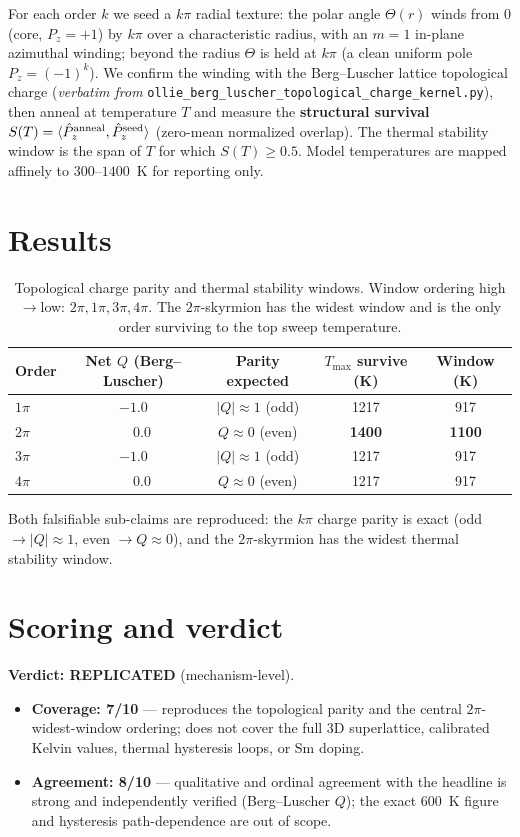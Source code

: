 \documentclass[11pt]{article}
\begin{document}
For each order $k$ we seed a $k\pi$ radial texture: the polar angle
$\Theta(r)$ winds from $0$ (core, $P_z=+1$) by $k\pi$ over a characteristic
radius, with an $m=1$ in-plane azimuthal winding; beyond the radius $\Theta$ is
held at $k\pi$ (a clean uniform pole $P_z=(-1)^k$). We confirm the winding with
the Berg--Luscher lattice topological charge (\emph{verbatim from}
\texttt{ollie\_berg\_luscher\_topological\_charge\_kernel.py}), then anneal at
temperature $T$ and measure the \textbf{structural survival}
$S(T)=\langle\hat P_z^{\rm anneal},\hat P_z^{\rm seed}\rangle$ (zero-mean
normalized overlap). The thermal stability window is the span of $T$ for which
$S(T)\ge0.5$. Model temperatures are mapped affinely to $300$--$1400$~K for
reporting only.

\section{Results}
\begin{table}[h]\centering
\begin{tabular}{lcccc}
\toprule
Order & Net $Q$ (Berg--Luscher) & Parity expected & $T_{\max}$ survive (K) & Window (K)\\
\midrule
$1\pi$ & $-1.0$ & $|Q|\!\approx\!1$ (odd) & 1217 & 917\\
$2\pi$ & $\phantom{-}0.0$ & $Q\!\approx\!0$ (even) & \textbf{1400} & \textbf{1100}\\
$3\pi$ & $-1.0$ & $|Q|\!\approx\!1$ (odd) & 1217 & 917\\
$4\pi$ & $\phantom{-}0.0$ & $Q\!\approx\!0$ (even) & 1217 & 917\\
\bottomrule
\end{tabular}
\caption{Topological charge parity and thermal stability windows. Window
ordering high$\to$low: $2\pi,1\pi,3\pi,4\pi$. The $2\pi$-skyrmion has the
widest window and is the only order surviving to the top sweep temperature.}
\end{table}

Both falsifiable sub-claims are reproduced: the $k\pi$ charge parity is exact
(odd $\to |Q|\approx1$, even $\to Q\approx0$), and the $2\pi$-skyrmion has the
widest thermal stability window.

\section{Scoring and verdict}
\textbf{Verdict: REPLICATED} (mechanism-level).
\begin{itemize}
\item \textbf{Coverage: 7/10} --- reproduces the topological parity and the
central $2\pi$-widest-window ordering; does not cover the full 3D superlattice,
calibrated Kelvin values, thermal hysteresis loops, or Sm doping.
\item \textbf{Agreement: 8/10} --- qualitative and ordinal agreement with the
headline is strong and independently verified (Berg--Luscher $Q$); the exact
600~K figure and hysteresis path-dependence are out of scope.
\end{itemize}
\end{document}

